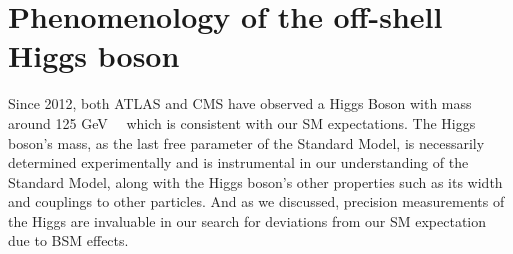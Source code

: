 








\section{Phenomenology of the off-shell Higgs boson}






Since 2012, both ATLAS and CMS have observed a Higgs Boson with mass around 125 GeV~\cite{20121}~\cite{201230} which is consistent with our SM expectations. The Higgs boson's mass, as the last free parameter of the Standard Model, is necessarily determined experimentally and is instrumental in our understanding of the Standard Model, along with the Higgs boson's other properties such as its width and couplings to other particles. And as we discussed, precision measurements of the Higgs are invaluable in our search for deviations from our SM expectation due to BSM effects.


